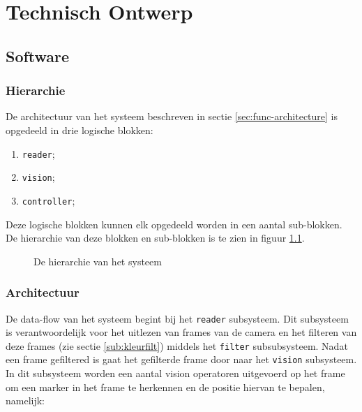 \chapter{Technisch Ontwerp}
\label{chap:technical}

\section{Software}
\subsection{Hierarchie}

De architectuur van het \autonerf systeem beschreven in sectie
\ref{sec:func-architecture} is opgedeeld in drie logische blokken:

\begin{enumerate}
    \item \texttt{reader};
    \item \texttt{vision};
    \item \texttt{controller};
\end{enumerate}

Deze logische blokken kunnen elk opgedeeld worden in een aantal sub-blokken.
De hierarchie van deze blokken en sub-blokken is te zien in figuur
\ref{fig:hierarchy}.

\begin{figure}[H]
    \begin{center}
        
    \end{center}
    \caption{De hierarchie van het \autonerf systeem}
    \label{fig:hierarchy}
\end{figure}

\subsection{Architectuur}

De data-flow van het systeem begint bij het \texttt{reader} subsysteem. Dit
subsysteem is verantwoordelijk voor het uitlezen van frames van de camera en
het filteren van deze frames (zie sectie \ref{sub:kleurfilt}) middels het
\texttt{filter} subsubsysteem. Nadat een frame gefiltered is gaat het
gefilterde frame door naar het \texttt{vision} subsysteem. In dit subsysteem
worden een aantal vision operatoren uitgevoerd op het frame om een marker in
het frame te herkennen en de positie hiervan te bepalen, namelijk:

